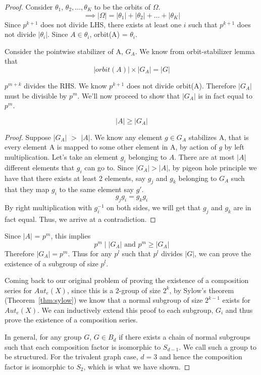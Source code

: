 \begin{proof}
Consider $\theta_{1}$, $\theta_{2}, \ldots , \theta_{K}$ to be the orbits of $\Omega$.
\[ \implies |\Omega| = |\theta_{1}| + |\theta_{2}| + \ldots + |\theta_{K}| \]
Since $p^{k+1}$ does not divide LHS, there exists at least one $i$ such that $p^{k+1}$ does not divide $|\theta_{i}|$. Since $A \in \theta_{i}$, orbit(A) = $\theta_{i}$.

Consider the pointwise stabilizer of A, $G_{A}$. We know from orbit-stabilizer lemma that
\[ |orbit(A)| \times |G_{A}| = |G| \]

$p^{m+k}$ divides the RHS. We know $p^{k+1}$ does not divide orbit(A). Therefore $|G_{A}|$ must be divisible by $p^{m}$. We'll now proceed to show that $|G_{A}|$ is in fact equal to $p^{m}$.

\begin{claim}
\[ |A| \geq |G_{A}| \]
\end{claim}

\begin{proof}
Suppose $|G_{A}|$ $>$ $|A|$. We know any element $g \in G_{A}$ stabilizes A, that is every element A is mapped to some other element in A, by action of $g$ by left multiplication. Let's take an element $g_{i}$ belonging to $A$. There are at most $|A|$ different elements that $g_{i}$ can go to. Since $|G_{A}| > |A|$, by pigeon hole principle we have that there exists at least 2 elements, say $g_{j}$ and $g_{k}$ belonging to $G_{A}$ such that they map $g_{i}$ to the same element say $g'$.
\[ g_{j}  g_{i} = g_{k}  g_{i} \]
By right multiplication with $g_{i}^{-1}$ on both sides, we will get that $g_{j}$ and $g_{k}$ are in fact equal. Thus, we arrive at a contradiction.
\end{proof}

Since $|A|$ = $p^{m}$, this implies \[ p^{m} \; | \; |G_{A}| \text{ and } p^m
\geq |G_{A}| \] Therefore $|G_{A}| = p^{m}$. Thus for any $p^{l}$ such that
$p^{l}$ divides $|G|$, we can prove the existence of a subgroup of size
$p^{l}$.

Coming back to our original problem of proving the existence of a composition
series for $Aut_{e}(X)$, since this is a $2$-group of size $2^{k}$, by Sylow's
theorem (Theorem~\ref{thm:sylow}) we know that a normal subgroup of size $2^{k-1}$
exists for $Aut_{e}(X)$. We can inductively extend this proof to each
subgroup, $G_{i}$ and thus prove the existence of a composition series.

In general, for any group $G$, $G \in B_{d}$ if there exists a chain of normal
subgroups such that each composition factor is isomorphic to $S_{d-1}$. We
call such a group to be structured. For the trivalent graph case, $d = 3$ and
hence the composition factor is isomorphic to $S_{2}$, which is what we have
shown.
\end{proof}

